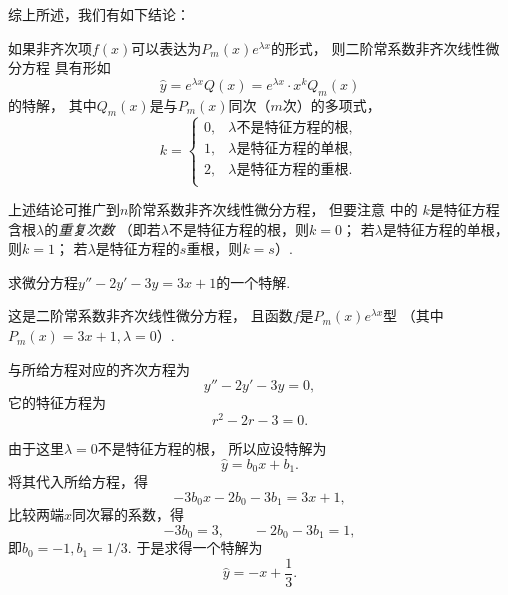 综上所述，我们有如下结论：
\begin{proposition}
如果非齐次项\(f(x)\)可以表达为\(P_m(x) e^{\lambda x}\)的形式，
则二阶常系数非齐次线性微分方程 
具有形如\begin{equation}\label{equation:微分方程.二阶常系数齐次线性微分方程.特解1}
	\hat{y} = e^{\lambda x} Q(x)
	= e^{\lambda x} \cdot x^k Q_m(x)
\end{equation}的特解，
其中\(Q_m(x)\)是与\(P_m(x)\)同次（\(m\)次）的多项式，\[
	k = \left\{ \begin{array}{ll}
		0, & \text{\(\lambda\)不是特征方程的根}, \\
		1, & \text{\(\lambda\)是特征方程的单根}, \\
		2, & \text{\(\lambda\)是特征方程的重根}. \\
	\end{array} \right.
\]
\end{proposition}

上述结论可推广到\(n\)阶常系数非齐次线性微分方程，
但要注意  中的
\(k\)是特征方程含根\(\lambda\)的\emph{重复次数}
（即若\(\lambda\)不是特征方程的根，则\(k=0\)；
若\(\lambda\)是特征方程的单根，则\(k=1\)；
若\(\lambda\)是特征方程的\(s\)重根，则\(k=s\)）.

\begin{example}
求微分方程\(y''-2y'-3y=3x+1\)的一个特解.
\begin{solution}
这是二阶常系数非齐次线性微分方程，
且函数\(f\)是\(P_m(x) e^{\lambda x}\)型
（其中\(P_m(x) = 3x+1, \lambda=0\)）.

与所给方程对应的齐次方程为\[
	y''-2y'-3y=0,
\]
它的特征方程为\[
	r^2-2r-3=0.
\]

由于这里\(\lambda=0\)不是特征方程的根，
所以应设特解为\[
	\hat{y} = b_0 x + b_1.
\]
将其代入所给方程，得\[
	-3 b_0 x - 2 b_0 - 3 b_1 = 3x+1,
\]
比较两端\(x\)同次幂的系数，得\[
	-3 b_0 = 3, \qquad -2 b_0 - 3 b_1 = 1,
\]
即\(b_0=-1, b_1=1/3\).
于是求得一个特解为\[
	\hat{y} = -x + \frac{1}{3}.
\]
\end{solution}
\end{example}

